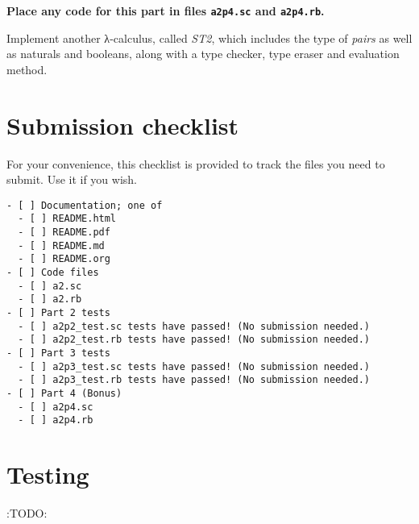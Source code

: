 \documentclass[11pt]{article}
\begin{document}
\begin{center}
\textbf{Place any code for this part in files \texttt{a2p4.sc} and \texttt{a2p4.rb}.}
\end{center}

Implement another λ-calculus, called \emph{ST2}, which includes
the type of \emph{pairs} as well as naturals and booleans,
along with a type checker, type eraser and evaluation method.

\section*{Submission checklist}
\label{sec:org410d7a8}
For your convenience, this checklist is provided
to track the files you need to submit.
Use it if you wish.
\begin{verbatim}
- [ ] Documentation; one of
  - [ ] README.html
  - [ ] README.pdf
  - [ ] README.md
  - [ ] README.org
- [ ] Code files
  - [ ] a2.sc
  - [ ] a2.rb
- [ ] Part 2 tests
  - [ ] a2p2_test.sc tests have passed! (No submission needed.)
  - [ ] a2p2_test.rb tests have passed! (No submission needed.)
- [ ] Part 3 tests
  - [ ] a2p3_test.sc tests have passed! (No submission needed.)
  - [ ] a2p3_test.rb tests have passed! (No submission needed.)
- [ ] Part 4 (Bonus)
  - [ ] a2p4.sc
  - [ ] a2p4.rb
\end{verbatim}

\section*{Testing}
\label{sec:orgf05da3b}
:TODO:
\end{document}

